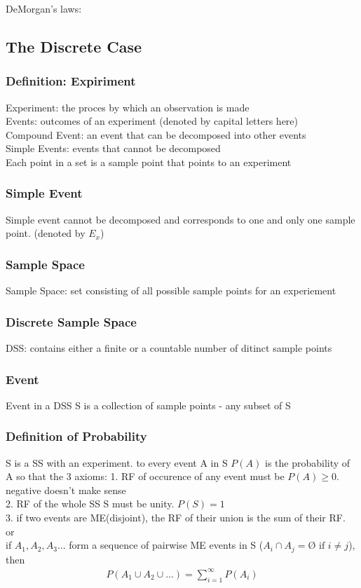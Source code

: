 \documentclass[12pt]{article}
\begin{document}
        DeMorgan's laws:
    
\subsection{The Discrete Case}
    \subsubsection{Definition: Expiriment}
        Experiment: the proces by which an observation is made\\
        Events: outcomes of an experiment (denoted by capital letters here)\\
        Compound Event: an event that can be decomposed into other events\\
        Simple Events: events that cannot be decomposed\\
        Each point in a set is a sample point that points to an experiment
    \subsubsection{Simple Event}
        Simple event cannot be decomposed and corresponds to
        one and only one sample point. (denoted by $ E_x $)
    \subsubsection{Sample Space}
        Sample Space: set consisting of all possible sample points for
        an experiement
    \subsubsection{Discrete Sample Space}
        DSS: contains either a finite or a countable number of 
        ditinct sample points
    \subsubsection{Event}
        Event in a DSS S is a collection of sample points - any subset of S
    \subsubsection{Definition of Probability}
        S is a SS with an experiment. to every event A in S
        $ P(A) $ is the probability of A so that the 3 axioms:
        1. RF of occurence of any event must be $ P(A)\ge  0$. negative doesn't
        make sense \\
        2. RF of the whole SS S must be unity. $ P(S) = 1 $\\
        3. if two events are ME(disjoint), the RF of their union is the sum of
        their RF.\\
        or\\
        if $ A_{1},A_{2},A_{3}... $ form a sequence of pairwise ME events
        in S ($ A_{i} \cap A_{j} = \text{\O} \text{ if } i\ne j$), then
        \begin{align*}
            P(A_{1} \cup A_{2} \cup ...) = \sum_{i= 1}^{\infty}P(A_{i}   )
        \end{align*}
\end{document}
